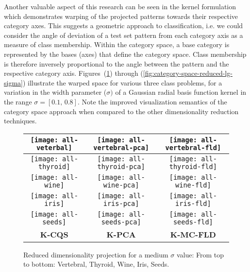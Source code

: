 Another valuable aspect of this research can be seen in the kernel
formulation which demonstrates warping of the projected patterns towards
their respective category axes. This suggests a geometric approach
to classification, i.e. we could consider the angle of deviation of
a test set pattern from each category axis as a measure of class membership.
Within the category space, a base category is represented by the bases
(axes) that define the category space. Class membership is therefore
inversely proportional to the angle between the pattern and the respective
category axis. Figures~(\ref{fig:category-space-reduced}) through
(\ref{fig:category-space-reduced-lg-sigma}) illustrate the warped
space for various three class problems, for a variation in the width
parameter ($\sigma)$ of a Gaussian radial basis function kernel in
the range $\sigma=[0.1,\,0.8]$. Note the improved visualization semantics
of the category space approach when compared to the other dimensionality
reduction techniques.
\begin{center}
\begin{figure}[H]
\begin{centering}
\begin{tabular}{|c|c|c|}
\hline 
\texttt{[image: all-veterbal]} & \texttt{[image: all-vertebral-pca]} & \texttt{[image: all-vertebral-fld]}\tabularnewline
\hline 
\texttt{[image: all-thyroid]} & \texttt{[image: all-thyroid-pca]} & \texttt{[image: all-thyroid-fld]}\tabularnewline
\hline 
\texttt{[image: all-wine]} & \texttt{[image: all-wine-pca]} & \texttt{[image: all-wine-fld]}\tabularnewline
\hline 
\texttt{[image: all-iris]} & \texttt{[image: all-iris-pca]} & \texttt{[image: all-iris-fld]}\tabularnewline
\hline 
\texttt{[image: all-seeds]} & \texttt{[image: all-seeds-pca]} & \texttt{[image: all-seeds-fld]}\tabularnewline
\hline 
\textbf{K-CQS} & \textbf{K-PCA} & \textbf{K-MC-FLD}\tabularnewline
\hline 
\end{tabular}
\par\end{centering}
\caption{Reduced dimensionality projection for a medium $\sigma$ value: From
top to bottom: Vertebral, Thyroid, Wine, Iris, Seeds.\label{fig:category-space-reduced}}
\end{figure}
\par\end{center}

